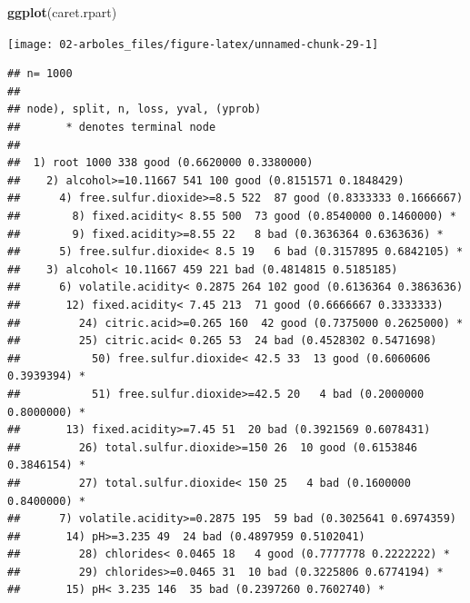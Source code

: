 \documentclass[
  spanish,
]{book}
\newenvironment{Shaded}{\begin{snugshade}}{\end{snugshade}}
\newcommand{\DataTypeTok}[1]{\textcolor[rgb]{0.13,0.29,0.53}{#1}}
\newcommand{\KeywordTok}[1]{\textcolor[rgb]{0.13,0.29,0.53}{\textbf{#1}}}
\newcommand{\NormalTok}[1]{#1}
\newcommand{\OperatorTok}[1]{\textcolor[rgb]{0.81,0.36,0.00}{\textbf{#1}}}
\newcommand{\StringTok}[1]{\textcolor[rgb]{0.31,0.60,0.02}{#1}}
\theoremstyle{break}
\theoremstyle{definition}
\theoremstyle{definition}
\theoremstyle{definition}
\theoremstyle{remark}
\begin{document}
\begin{Shaded}
\begin{Highlighting}[]
\KeywordTok{ggplot}\NormalTok{(caret.rpart)}
\end{Highlighting}
\end{Shaded}

\begin{center}\texttt{[image: 02-arboles\_files/figure-latex/unnamed-chunk-29-1]} \end{center}

\begin{Shaded}
\end{Shaded}

\begin{verbatim}
## n= 1000 
## 
## node), split, n, loss, yval, (yprob)
##       * denotes terminal node
## 
##  1) root 1000 338 good (0.6620000 0.3380000)  
##    2) alcohol>=10.11667 541 100 good (0.8151571 0.1848429)  
##      4) free.sulfur.dioxide>=8.5 522  87 good (0.8333333 0.1666667)  
##        8) fixed.acidity< 8.55 500  73 good (0.8540000 0.1460000) *
##        9) fixed.acidity>=8.55 22   8 bad (0.3636364 0.6363636) *
##      5) free.sulfur.dioxide< 8.5 19   6 bad (0.3157895 0.6842105) *
##    3) alcohol< 10.11667 459 221 bad (0.4814815 0.5185185)  
##      6) volatile.acidity< 0.2875 264 102 good (0.6136364 0.3863636)  
##       12) fixed.acidity< 7.45 213  71 good (0.6666667 0.3333333)  
##         24) citric.acid>=0.265 160  42 good (0.7375000 0.2625000) *
##         25) citric.acid< 0.265 53  24 bad (0.4528302 0.5471698)  
##           50) free.sulfur.dioxide< 42.5 33  13 good (0.6060606 0.3939394) *
##           51) free.sulfur.dioxide>=42.5 20   4 bad (0.2000000 0.8000000) *
##       13) fixed.acidity>=7.45 51  20 bad (0.3921569 0.6078431)  
##         26) total.sulfur.dioxide>=150 26  10 good (0.6153846 0.3846154) *
##         27) total.sulfur.dioxide< 150 25   4 bad (0.1600000 0.8400000) *
##      7) volatile.acidity>=0.2875 195  59 bad (0.3025641 0.6974359)  
##       14) pH>=3.235 49  24 bad (0.4897959 0.5102041)  
##         28) chlorides< 0.0465 18   4 good (0.7777778 0.2222222) *
##         29) chlorides>=0.0465 31  10 bad (0.3225806 0.6774194) *
##       15) pH< 3.235 146  35 bad (0.2397260 0.7602740) *
\end{verbatim}

\begin{Shaded}
\end{Shaded}
\end{document}
